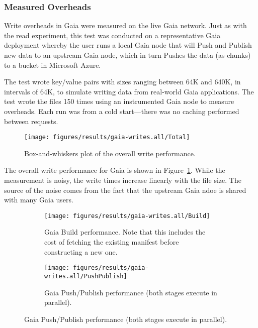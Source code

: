 \subsubsection{Measured Overheads}

Write overheads in Gaia were measured on the live Gaia network.  Just as with
the read experiment, this test was conducted on a representative Gaia deployment
whereby the user runs a local Gaia node that will Push and Publish new data to
an upstream Gaia node, which in turn Pushes the data (as chunks) to a bucket in
Microsoft Azure.

The test wrote key/value pairs with sizes ranging between 64K and 640K, in
intervals of 64K, to simulate writing
data from real-world Gaia applications.  The test wrote the files 150 times
using an instrumented Gaia node to measure overheads.  Each run was from a cold
start---there was no caching performed between requests.

\begin{figure}[htp!]
   \centering
   \caption{Box-and-whiskers plot of the overall write performance.}
   \texttt{[image: figures/results/gaia-writes.all/Total]}
   \label{fig:gaia-write-total}
\end{figure}

The overall write performance for Gaia is shown in
Figure~\ref{fig:gaia-write-total}.  While the measurement is noisy, the write
times increase linearly with the file size.  The source of the noise comes from
the fact that the upstream Gaia ndoe is shared with many Gaia users.

\begin{figure}[htp!]
   \centering
   \caption{Box-and-whiskers plots of mutate flow stage performances in Gaia,
   for file sizes between 64K and 640K in increments of 64K.}
   \begin{subfigure}[b]{.8\textwidth}
      \texttt{[image: figures/results/gaia-writes.all/Build]}
      \label{fig:gaia-write-build}
      \caption{Gaia Build performance.  Note that this includes the cost of
      fetching the existing manifest before constructing a new one.}
   \end{subfigure}
   \begin{subfigure}[b]{.8\textwidth}
      \texttt{[image: figures/results/gaia-writes.all/PushPublish]}
      \label{fig:gaia-write-pushpublish}
      \caption{Gaia Push/Publish performance (both stages execute in parallel).}
   \end{subfigure}
   \label{fig:gaia-write-stages}
\end{figure}

